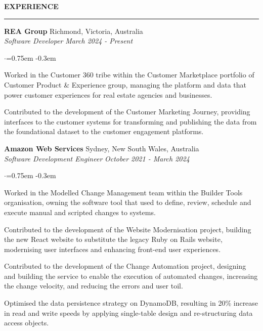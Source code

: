 \documentclass{cv}
\def\sectionskip{\medskip}
\begin{document}
\sectionskip
{} \textbf{EXPERIENCE}
\sectionlineskip
\hrule
\begin{list}{}{\setlength{\leftmargin}{0em}}
\item[] 
    \textbf{REA Group} \hfill {Richmond, Victoria, Australia}%
    \\ 
    {\em Software Developer} \hfill {\em March 2024 - Present}%
    \begin{list}{$\cdot$}{\leftmargin=0.75em}
    \itemsep -0.3em \vspace{-0.3em}
        \item Worked in the Customer 360 tribe within the Customer Marketplace portfolio of Customer Product \& Experience group, managing the platform and data that power customer experiences for real estate agencies and businesses.
        \item Contributed to the development of the Customer Marketing Journey, providing interfaces to the customer systems for transforming and publishing the data from the foundational dataset to the customer engagement platforms.
    \end{list}
    \smallskip
\item[] 
    \textbf{Amazon Web Services} \hfill {Sydney, New South Wales, Australia}%
    \\ 
    {\em Software Development Engineer} \hfill {\em October 2021 - March 2024}%
    \begin{list}{$\cdot$}{\leftmargin=0.75em}
    \itemsep -0.3em \vspace{-0.3em}
        \item Worked in the Modelled Change Management team within the Builder Tools organisation, owning the software tool that used to define, review, schedule and execute manual and scripted changes to systems.
        \item Contributed to the development of the Website Modernisation project, building the new React website to substitute the legacy Ruby on Rails website, modernising user interfaces and enhancing front-end user experiences.
        \item Contributed to the development of the Change Automation project, designing and building the service to enable the execution of automated changes, increasing the change velocity, and reducing the errors and user toil.
        \item Optimised the data persistence strategy on DynamoDB, resulting in 20\% increase in read and write speeds by applying single-table design and re-structuring data access objects.

\end{list}
\end{list}
\end{document}
